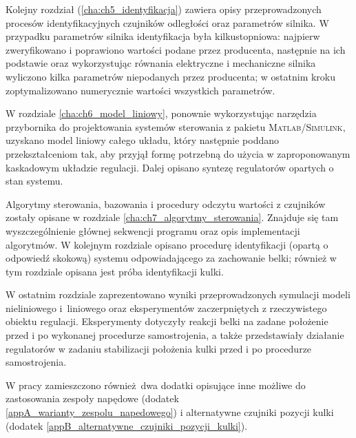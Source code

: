 Kolejny rozdział (\ref{cha:ch5_identyfikacja}) zawiera opisy przeprowadzonych procesów identyfikacyjnych czujników odległości oraz parametrów silnika. W przypadku parametrów silnika identyfikacja była kilkustopniowa: najpierw zweryfikowano i poprawiono wartości podane przez producenta, następnie na ich podstawie oraz wykorzystując równania elektryczne i mechaniczne silnika wyliczono kilka parametrów niepodanych przez producenta; w ostatnim kroku zoptymalizowano numerycznie wartości wszystkich parametrów.

W rozdziale \ref{cha:ch6_model_liniowy}, ponownie wykorzystując narzędzia przybornika do projektowania systemów sterowania z pakietu \textsc{Matlab/Simulink}, uzyskano model liniowy całego układu, który następnie poddano przekształceniom tak, aby przyjął formę potrzebną do użycia w zaproponowanym kaskadowym układzie regulacji. Dalej opisano syntezę regulatorów opartych o stan systemu.

Algorytmy sterowania, bazowania i procedury odczytu wartości z czujników zostały opisane w rozdziale \ref{cha:ch7_algorytmy_sterowania}. Znajduje się tam wyszczególnienie głównej sekwencji programu oraz opis implementacji algorytmów. W kolejnym rozdziale opisano procedurę identyfikacji (opartą o odpowiedź skokową) systemu odpowiadającego za zachowanie belki; również w tym rozdziale opisana jest próba identyfikacji kulki.

W ostatnim rozdziale zaprezentowano wyniki przeprowadzonych symulacji modeli nieliniowego i~liniowego oraz eksperymentów zaczerpniętych z rzeczywistego obiektu regulacji. Eksperymenty dotyczyły reakcji belki na zadane położenie przed i po wykonanej procedurze samostrojenia, a także przedstawiały działanie regulatorów w zadaniu stabilizacji położenia kulki przed i po procedurze samostrojenia.

W pracy zamieszczono również dwa dodatki opisujące inne możliwe do zastosowania zespoły napędowe (dodatek \ref{appA_warianty_zespolu_napedowego}) i alternatywne czujniki pozycji kulki (dodatek \ref{appB_alternatywne_czujniki_pozycji_kulki}).


